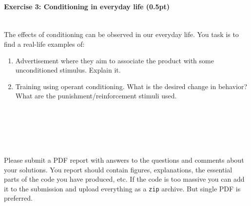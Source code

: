 \documentclass[a4paper,11pt]{article}
\newenvironment{exercise}[3]{\paragraph{Exercise #1: #2 (#3pt)}\ \\}{
\medskip}
\begin{document}
%
% 
%
\begin{exercise}{3}{Conditioning in everyday life}{0.5}
The effects of conditioning can be observed in our everyday life. You task is to find a real-life examples of:
\begin{enumerate}
	\item Advertisement where they aim to associate the product with some unconditioned stimulus. Explain it.
	\item Training using operant conditioning. What is the desired change in behavior? What are the punishment/reinforcement stimuli used.
\end{enumerate}
\end{exercise}

\ \\
\ \\
\ \\
\ \\
\ \\
Please submit a PDF report with answers to the questions and comments about your solutions. You report should contain figures, explanations, the essential parts of the code you have produced, etc. If the code is too massive you can add it to the submission and upload everything as a \texttt{zip} archive. But single PDF is preferred.
\end{document}
